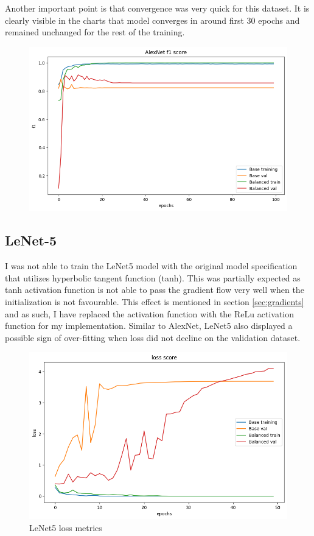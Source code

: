 Another important point is that convergence was very quick for this dataset. 
It is clearly visible in the charts that model converges in around first 30 epochs and remained unchanged for the rest of the training.

\begin{figure}[H]
    \centering
    \includegraphics[width=.8\textwidth]{img/alexnetf1.png}
    \caption{}
    \label{fig:alexf1}
\end{figure}


\subsection{LeNet-5}
I was not able to train the LeNet5 model with the original model specification that utilizes hyperbolic tangent function (tanh).
This was partially expected as tanh activation function is not able to pass the gradient flow very well when the initialization is not favourable.
This effect is mentioned in section \ref{sec:gradients} and as such, I have replaced the activation function with the ReLu activation function for my implementation.
Similar to AlexNet, LeNet5 also displayed a possible sign of over-fitting when loss did not decline on the validation dataset.

\begin{figure}[H]
    \centering
    \includegraphics[width=.8\textwidth]{img/lenetloss.png}
    \caption{LeNet5 loss metrics}
    \label{fig:lenetloss}
\end{figure}

